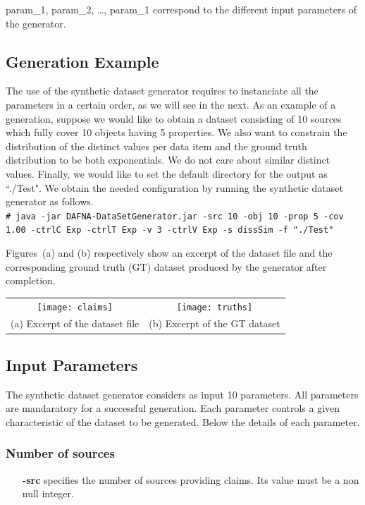 \documentclass[a4paper,10pt]{scrartcl}
\newcommand{\shellcmd}[1]{\vspace*{1cm}\\\indent\indent\texttt{\# #1}\vspace*{1cm}}
\begin{document}
\noindent param\_1, param\_2, \ldots, param\_1 correspond to the different input parameters
of the generator.


\subsection{Generation Example}
The use of the synthetic dataset generator requires to instanciate all the  parameters in a certain order, as we will see in the next.
As an example of a generation, suppose we would like to obtain a dataset consisting of 10 sources which fully cover  10 objects having 5 
properties. We also want to constrain the distribution of the distinct values per data item and the ground truth distribution to be both exponentials.
We do not care about similar distinct values. Finally, we would like to set the default directory for the output as ``./Test". 
We obtain the needed configuration by running the synthetic dataset generator as follows.
\shellcmd{java -jar DAFNA-DataSetGenerator.jar -src 10 -obj 10 -prop 5 -cov 1.00 -ctrlC Exp -ctrlT Exp -v 3 -ctrlV Exp -s dissSim -f "./Test"}

Figures~(a) and (b) respectively show an excerpt of the dataset file and the corresponding ground truth (GT) dataset produced by the generator
after completion.\\


\begin{tabular}{cc}
\texttt{[image: claims]}&\texttt{[image: truths]}\\
(a) Excerpt of the dataset file & (b) Excerpt of the GT dataset\\
\end{tabular}


\subsection{Input Parameters}
The synthetic dataset generator considers as input 10 parameters.
All parameters are mandaratory for a successful generation. Each 
parameter controls a given characteristic of the dataset to be generated.
Below the details of each parameter.

\subsubsection{Number of sources}
\begin{itemize}
 \item[\textbf{-src}] specifies the number of sources providing claims. Its value must be a non null integer.
 \end{itemize}
\end{document}
